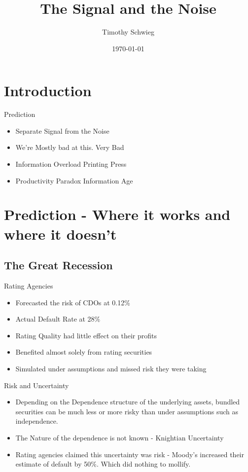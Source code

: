 \documentclass[bigger]{beamer}
\author{Timothy Schwieg}
\date{\today}
\title{The Signal and the Noise}
\begin{document}
\maketitle

\section{Introduction}
\label{sec-1}

\begin{frame}[label=sec-1-0-1]{Prediction}
\begin{itemize}
\item Separate Signal from the Noise
\item We're Mostly bad at this. Very Bad
\item Information Overload  Printing Press
\item Productivity Paradox  Information Age
\end{itemize}
\end{frame}

\section{Prediction - Where it works and where it doesn't}
\label{sec-2}
\subsection{The Great Recession}
\label{sec-2-1}

\begin{frame}[label=sec-2-1-1]{Rating Agencies}
\begin{itemize}
\item Forecasted the risk of CDOs at 0.12\%
\item Actual Default Rate at 28\%
\item Rating Quality had little effect on their profits
\item Benefited almost solely from rating securities
\item Simulated under assumptions and missed risk they were taking
\end{itemize}
\end{frame}


\begin{frame}[label=sec-2-1-2]{Risk and Uncertainty}
\begin{itemize}
\item Depending on the Dependence structure of the underlying assets,
bundled securities can be much less or more risky than under
assumptions such as independence.
\item The Nature of the dependence is not known - Knightian Uncertainty
\item Rating agencies claimed this uncertainty was risk - Moody's
increased their estimate of default by 50\%. Which did nothing to
mollify.
\end{itemize}
\end{frame}
\end{document}
